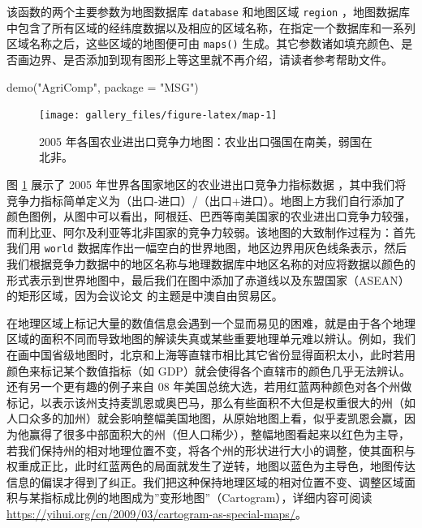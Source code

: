\documentclass[
  b5paper,
  UTF8,twoside]{book}
\newenvironment{Shaded}{\begin{snugshade}}{\end{snugshade}}
\newcommand{\AttributeTok}[1]{\textcolor[rgb]{0.77,0.63,0.00}{#1}}
\newcommand{\FunctionTok}[1]{\textcolor[rgb]{0.00,0.00,0.00}{#1}}
\newcommand{\NormalTok}[1]{#1}
\newcommand{\StringTok}[1]{\textcolor[rgb]{0.31,0.60,0.02}{#1}}
\begin{document}
该函数的两个主要参数为地图数据库 \texttt{database} 和地图区域 \texttt{region} ，地图数据库中包含了所有区域的经纬度数据以及相应的区域名称，在指定一个数据库和一系列区域名称之后，这些区域的地图便可由 \texttt{maps()} 生成。其它参数诸如填充颜色、是否画边界、是否添加到现有图形上等这里就不再介绍，请读者参考帮助文件。





\begin{Shaded}
\begin{Highlighting}[]
\FunctionTok{demo}\NormalTok{(}\StringTok{"AgriComp"}\NormalTok{, }\AttributeTok{package =} \StringTok{"MSG"}\NormalTok{)}
\end{Highlighting}
\end{Shaded}

\begin{figure}

{\centering \texttt{[image: gallery\_files/figure-latex/map-1]} 

}

\caption[2005 年世界各国农业进出口竞争力地图]{2005 年各国农业进出口竞争力地图：农业出口强国在南美，弱国在北非。}\label{fig:map}
\end{figure}

图 \ref{fig:map}
展示了 2005 年世界各国家地区的农业进出口竞争力指标数据 \citep{Xie07}，其中我们将竞争力指标简单定义为（出口-进口）/（出口+进口）。地图上方我们自行添加了颜色图例，从图中可以看出，阿根廷、巴西等南美国家的农业进出口竞争力较强，而利比亚、阿尔及利亚等北非国家的竞争力较弱。该地图的大致制作过程为：首先我们用 \texttt{world} 数据库作出一幅空白的世界地图，地区边界用灰色线条表示，然后我们根据竞争力数据中的地区名称与地理数据库中地区名称的对应将数据以颜色的形式表示到世界地图中，最后我们在图中添加了赤道线以及东盟国家（ASEAN）的矩形区域，因为会议论文 \citet{Xie07} 的主题是中澳自由贸易区。

在地理区域上标记大量的数值信息会遇到一个显而易见的困难，就是由于各个地理区域的面积不同而导致地图的解读失真或某些重要地理单元难以辨认。例如，我们在画中国省级地图时，北京和上海等直辖市相比其它省份显得面积太小，此时若用颜色来标记某个数值指标（如 GDP）就会使得各个直辖市的颜色几乎无法辨认。还有另一个更有趣的例子来自 08 年美国总统大选，若用红蓝两种颜色对各个州做标记，以表示该州支持麦凯恩或奥巴马，那么有些面积不大但是权重很大的州（如人口众多的加州）就会影响整幅美国地图，从原始地图上看，似乎麦凯恩会赢，因为他赢得了很多中部面积大的州（但人口稀少），整幅地图看起来以红色为主导，若我们保持州的相对地理位置不变，将各个州的形状进行大小的调整，使其面积与权重成正比，此时红蓝两色的局面就发生了逆转，地图以蓝色为主导色，地图传达信息的偏误才得到了纠正。我们把这种保持地理区域的相对位置不变、调整区域面积与某指标成比例的地图成为''变形地图''（Cartogram），详细内容可阅读 \url{https://yihui.org/cn/2009/03/cartogram-as-special-maps/}。
\end{document}
